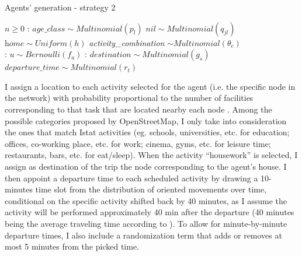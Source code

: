 \begin{algorithm}[h!]
\caption{Agents' generation - strategy 2}\label{alg2}
\begin{algorithmic}
\Require $n \geq 0$
:
\State $\textit{age\_class} \sim Multinomial(p_l)$ 
\State $\textit{nil} \sim Multinomial(q_{jl})$ 
\State $\textit{home} \sim Uniform(h)$ 
\State \textit{activity\_combination} $\sim Multinomial(\theta_c)$
\\
:
\State $ \textit{u} \sim Bernoulli(f_a)$ 
:
    \State $\textit{destination} \sim Multinomial(g_s)$ \\
    \State $\textit{departure\_time} \sim Multinomial(r_t)$ \\
\EndIf
\EndFor
\EndFor
\end{algorithmic}
\end{algorithm}

I assign a location to each activity selected for the agent (i.e. the specific node in the network) with probability proportional to the number of facilities corresponding to that task that are located nearby each node \cite{site9}. Among the possible categories proposed by OpenStreetMap, I only take into consideration the ones that match Istat activities (eg. schools, universities, etc. for education; offices, co-working place, etc. for work; cinema, gyms, etc. for leisure time; restaurants, bars, etc. for eat/sleep). When the activity “housework” is selected, I assign as destination of the trip the node corresponding to the agent’s house. I then appoint a departure time to each scheduled activity by drawing a 10-minutes time slot from the distribution of oriented movements over time, conditional on the specific activity \cite{site11} shifted back by 40 minutes, as I assume the activity will be performed approximately 40 min after the departure (40 minutes being the average traveling time according to \cite{bib2}). To allow for minute-by-minute departure times, I also include a randomization term that adds or removes at most 5 minutes from the picked time. 

